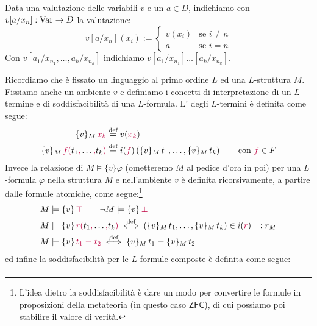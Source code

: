 \begin{notation}
    Data una valutazione delle variabili $v$ e un $a \in D$, indichiamo con $v[a/x_n] : \operatorname{Var} \to D$ la valutazione:
    \[ v[a/x_n](x_i) := \begin{cases}
        v(x_i) &\text{se $i \neq n$} \\
        a &\text{se $i = n$}
    \end{cases}
    \]
    Con $v[a_1/x_{n_1},\ldots,a_k/x_{n_k}]$ indichiamo $v[a_1/x_{n_1}]\ldots[a_k/x_{n_k}]$.
\end{notation}

\begin{definition}
    Ricordiamo che è fissato un linguaggio al primo ordine $L$ ed una $L$-struttura $M$. Fissiamo anche un ambiente $v$ e definiamo i concetti di interpretazione di un $L$-termine e di soddisfacibilità di una $L$-formula.
    L' degli $L$-termini è definita come segue:
    \[ \begin{aligned}
        \{v\}_M \, \textcolor{purple}{x_k} &\overset{\text{def}}{=} v(\textcolor{purple}{x_k}) \\
        \{v\}_M \, \textcolor{purple}{f}\textcolor{purple}{(} t_1\textcolor{purple}{,} \ldots\textcolor{purple}{,} t_k \textcolor{purple}{)} &\overset{\text{def}}{=} i(\textcolor{purple}{f})\left(\{v\}_M \, t_1, \ldots, \{v\}_M \, t_k\right) \qquad \text{con $\textcolor{purple}{f} \in F$}
    \end{aligned} \]
    Invece la relazione di  $M \models \{v\}\varphi$ (ometteremo $M$ al pedice d'ora in poi) per una $L$-formula $\varphi$ nella struttura $M$ e nell'ambiente $v$ è definita ricorsivamente, a partire dalle formule atomiche, come segue:\footnote{L'idea dietro la soddisfacibilità è dare un modo per convertire le formule in proposizioni della metateoria (in questo caso $\mathsf{ZFC}$), di cui possiamo poi stabilire il valore di verità.}
    \begin{align*}
        &M \models \{v\} \textcolor{purple}{\,\top} \qquad \neg M \models \{v\} \textcolor{purple}{\,\bot} \\
        &M \models \{v\} \textcolor{purple}{\,r(} t_1\textcolor{purple}{,} \ldots\textcolor{purple}{,} t_k \textcolor{purple}{)} \overset{\text{def}}{\iff} \left(\{v\}_M \, t_1, \ldots, \{v\}_M \, t_k\right) \in i(\textcolor{purple}{r}) =: r_M \\
        &M \models \{v\} \textcolor{purple}{\,t_1 = t_2} \overset{\text{def}}{\iff} \{v\}_M \, t_1 = \{v\}_M \, t_2
    \end{align*}
    ed infine la soddisfacibilità per le $L$-formule composte è definita come segue:
    \begin{align*}

\end{align*}
\end{definition}
